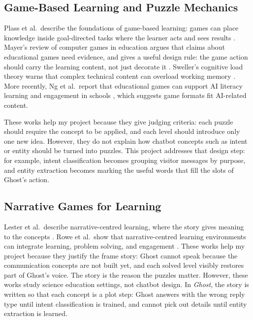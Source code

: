 \documentclass[11pt,a4paper]{article}
\begin{document}
\subsection{Game-Based Learning and Puzzle Mechanics}

Plass et al.\ describe the foundations of game-based learning: games can place knowledge inside goal-directed tasks where the learner acts and sees results \cite{plass2015}. Mayer's review of computer games in education argues that claims about educational games need evidence, and gives a useful design rule: the game action should carry the learning content, not just decorate it \cite{mayer2019}. Sweller's cognitive load theory warns that complex technical content can overload working memory \cite{sweller1988}. More recently, Ng et al.\ report that educational games can support AI literacy learning and engagement in schools \cite{ng2024}, which suggests game formats fit AI-related content.

These works help my project because they give judging criteria: each puzzle should require the concept to be applied, and each level should introduce only one new idea. However, they do not explain how chatbot concepts such as intent or entity should be turned into puzzles. This project addresses that design step: for example, intent classification becomes grouping visitor messages by purpose, and entity extraction becomes marking the useful words that fill the slots of Ghost's action.

\subsection{Narrative Games for Learning}

Lester et al.\ describe narrative-centred learning, where the story gives meaning to the concepts \cite{lester2014}. Rowe et al.\ show that narrative-centred learning environments can integrate learning, problem solving, and engagement \cite{rowe2011}. These works help my project because they justify the frame story: Ghost cannot speak because the communication concepts are not built yet, and each solved level visibly restores part of Ghost's voice. The story is the reason the puzzles matter. However, these works study science education settings, not chatbot design. In \textit{Ghost}, the story is written so that each concept is a plot step: Ghost answers with the wrong reply type until intent classification is trained, and cannot pick out details until entity extraction is learned.
\end{document}
